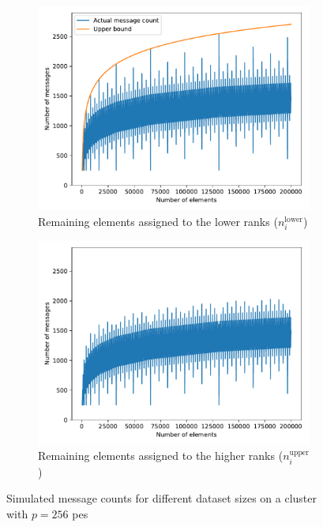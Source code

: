 \begin{figure}
\centering
\begin{subfigure}{0.48\textwidth}
\centering
\includegraphics[width=1.0\textwidth]{figures/message_count_256.pdf}
\caption{Remaining elements assigned to the lower ranks ($n_i^\textrm{lower}$)}
\label{fig:messageCount256Lower}
\end{subfigure}
\hfill
\begin{subfigure}{0.48\textwidth}
\centering
\includegraphics[width=1.0\textwidth]{figures/message_count_256_remainder_at_end.pdf}
\caption{Remaining elements assigned to the higher ranks ($n_i^\textrm{upper}$)}
\label{fig:messageCount256Upper}
\end{subfigure}
\caption{Simulated message counts for different dataset sizes on a cluster with $p=256$ \glspl{pe}}
\label{fig:messageCount256}
\end{figure}


